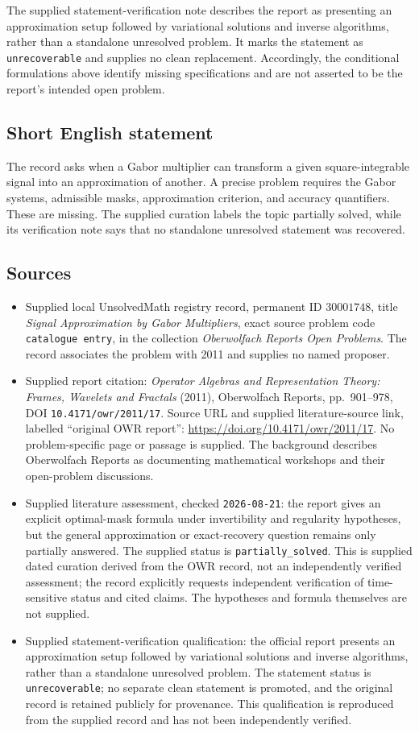 \documentclass[11pt]{article}
\begin{document}
The supplied statement-verification note describes the report as presenting an approximation setup followed by variational solutions and inverse algorithms, rather than a standalone unresolved problem. It marks the statement as \texttt{unrecoverable} and supplies no clean replacement. Accordingly, the conditional formulations above identify missing specifications and are not asserted to be the report's intended open problem.
\subsection{Short English statement}
The record asks when a Gabor multiplier can transform a given square-integrable signal into an approximation of another. A precise problem requires the Gabor systems, admissible masks, approximation criterion, and accuracy quantifiers. These are missing. The supplied curation labels the topic partially solved, while its verification note says that no standalone unresolved statement was recovered.
\subsection{Sources}
\begin{itemize}
\item Supplied local UnsolvedMath registry record, permanent ID \(30001748\), title \emph{Signal Approximation by Gabor Multipliers}, exact source problem code \texttt{catalogue entry}, in the collection \emph{Oberwolfach Reports Open Problems}. The record associates the problem with 2011 and supplies no named proposer.
\item Supplied report citation: \emph{Operator Algebras and Representation Theory: Frames, Wavelets and Fractals} (2011), Oberwolfach Reports, pp.\ 901--978, DOI \texttt{10.4171/owr/2011/17}. Source URL and supplied literature-source link, labelled ``original OWR report'': \url{https://doi.org/10.4171/owr/2011/17}. No problem-specific page or passage is supplied. The background describes Oberwolfach Reports as documenting mathematical workshops and their open-problem discussions.
\item Supplied literature assessment, checked \texttt{2026-08-21}: the report gives an explicit optimal-mask formula under invertibility and regularity hypotheses, but the general approximation or exact-recovery question remains only partially answered. The supplied status is \texttt{partially\_solved}. This is supplied dated curation derived from the OWR record, not an independently verified assessment; the record explicitly requests independent verification of time-sensitive status and cited claims. The hypotheses and formula themselves are not supplied.
\item Supplied statement-verification qualification: the official report presents an approximation setup followed by variational solutions and inverse algorithms, rather than a standalone unresolved problem. The statement status is \texttt{unrecoverable}; no separate clean statement is promoted, and the original record is retained publicly for provenance. This qualification is reproduced from the supplied record and has not been independently verified.
\end{itemize}
\end{document}
